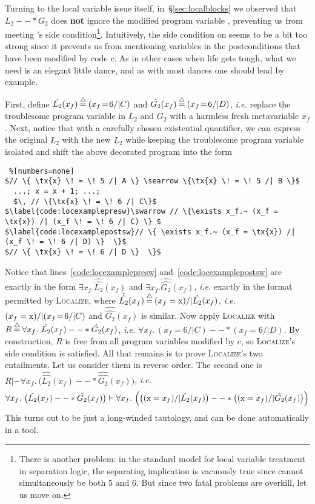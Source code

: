 Turning to the local variable issue itself, in~\S\ref{sec:localblocks} we observed 
that $L_2 --* G_2$ does \textbf{not} ignore the modified program variable , 
preventing us from meeting 's side condition\footnote{There is 
another problem: in the standard model for local variable treatment in separation logic, 
the separating implication is vacuously true since  cannot simultaneously be 
both $5$ and $6$.  But since two fatal problems are overkill, let us move on.}.  
Intuitively, the side condition on  seems to be a bit too strong 
since it prevents us from mentioning variables in the postconditions that have been modified 
by code $c$.  As in other cases when life gets tough, what we need is an elegant little dance, and as with most dances one should lead by example.

First, define $\hat{L_2}(x_f) \mathbin{\stackrel{\triangle}{=}} (x_f \! = \! 6 /| C)$ and
$\hat{G_2}(x_f) \mathbin{\stackrel{\triangle}{=}} (x_f \! = \! 6 /| D)$, \emph{i.e.} replace the troublesome program variable  in $L_2$ and $G_2$ with a harmless fresh metavariable $x_f$.  Next, notice that with a carefully chosen existential quantifier, we can express the original $L_2$ with the new $\hat{L_2}$
while keeping the troublesome program variable  isolated and shift the above decorated program
into the form
\begin{lstlisting} %[numbers=none]
$// \{ \tx{x} \! = \! 5 /| A \} \searrow \{\tx{x} \! = \! 5 /| B \}$
  ...; x = x + 1; ...;
  $\, // \{\tx{x} \! = \! 6 /| C\}$
$\label{code:locexamplepresw}\swarrow // \{\exists x_f.~ (x_f = \tx{x}) /| (x_f \! = \! 6 /| C) \} $
$\label{code:locexamplepostsw}// \{ \exists x_f.~ (x_f = \tx{x}) /| (x_f \! = \! 6 /| D) \}  \}$
$// \{ \tx{x} \! = \! 6 /| D \}  \}$
\end{lstlisting}
Notice that lines~\ref{code:locexamplepresw} and~\ref{code:locexamplepostsw}
are exactly in the form $\exists x_f. \hat{\hat{L_2}}(x_f)$ and $\exists x_f. \hat{\hat{G_2}}(x_f)$, \emph{i.e.} exactly in the format permitted by \textsc{Localize}, where $\hat{\hat{L_2}}(x_f) \mathbin{\stackrel{\triangle}{=}} (x_f = \text{x}) /| \hat{L_2}(x_f)$, \emph{i.e.} $(x_f = \text{x}) /| (x_f \! = \! 6 /| C)$ and $\hat{\hat{G_2}}(x_f)$ is similar. %
Now apply \textsc{Localize} with $R \mathbin{\stackrel{\triangle}{=}} \forall x_f.~\hat{L_2}(x_f) --* \hat{G_2}(x_f)$, \emph{i.e.} $\forall x_f.~(x_f \! = \! 6 /| C) --* (x_f \! = \! 6 /| D)$.  By construction, $R$
is free from all program variables modified by $c$, so \textsc{Localize}'s side condition is
satisfied.  All that remains is to prove \textsc{Localize}'s two entailments.  Let us consider
them in reverse order.  The second one is $R |- \forall x_f.~ \big(\hat{\hat{L_2}}(x_f) --* \hat{\hat{G_2}}(x_f)\big)$, \emph{i.e.}
\[
\forall x_f.~\big(\hat{L_2}(x_f) --* \hat{G_2}(x_f)\big) |- \forall x_f.~\Big(\big((\text{x} = x_f) /| \hat{L_2}(x_f)\big) --* \big((\text{x} = x_f) /| \hat{G_2}(x_f)\big)\Big)
\]
This turns out to be just a long-winded tautology, and can be done automatically in a tool.

